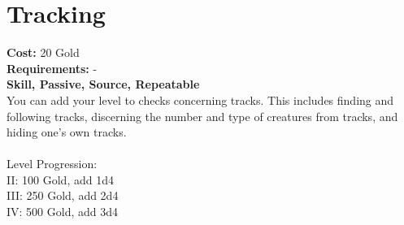 \section*{Tracking}
\textbf{Cost:} 20 Gold\\
\textbf{Requirements:} -\\
\textbf{Skill, Passive, Source, Repeatable}\\
You can add your level to checks concerning tracks. This includes finding and following tracks, discerning the number and type of creatures from tracks, and hiding one's own tracks.\\
\\
Level Progression:\\
II: 100 Gold, add 1d4\\
III: 250 Gold, add 2d4\\
IV: 500 Gold, add 3d4\\